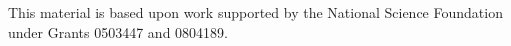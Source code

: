 \noindent

\bigskip\noindent
This material is based upon work supported by the National Science
Foundation under
Grants 0503447 and 0804189.

\bigskip\noindent\svninfo 


\bigskip\noindent


\smallskip
\newpage

